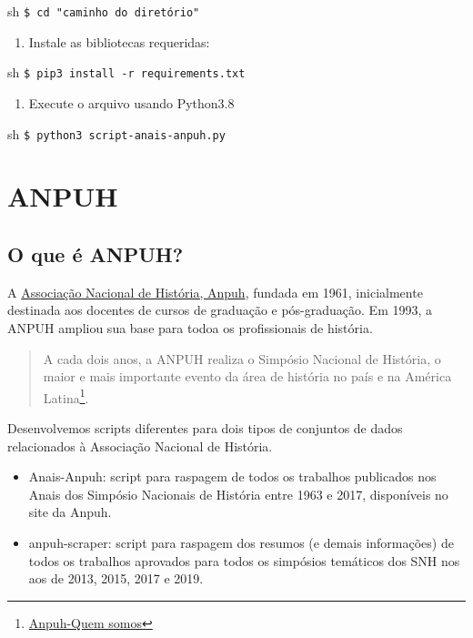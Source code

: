 \documentclass[
]{book}
\providecommand{\tightlist}{%
  \setlength{\itemsep}{0pt}\setlength{\parskip}{0pt}}
\begin{document}
sh
\texttt{\$\ cd\ "caminho\ do\ diretório"}

\begin{enumerate}
\def\labelenumi{\arabic{enumi}.}
\tightlist
\item
  Instale as bibliotecas requeridas:
\end{enumerate}

sh
\texttt{\$\ pip3\ install\ -r\ requirements.txt}

\begin{enumerate}
\def\labelenumi{\arabic{enumi}.}
\tightlist
\item
  Execute o arquivo usando Python3.8
\end{enumerate}

sh
\texttt{\$\ python3\ script-anais-anpuh.py}

\hypertarget{anpuh}{%
\chapter{ANPUH}\label{anpuh}}

\hypertarget{o-que-uxe9-anpuh}{%
\section{O que é ANPUH?}\label{o-que-uxe9-anpuh}}

A \href{https://anpuh.org.br/index.php}{Associação Nacional de História, Anpuh}, fundada em 1961, inicialmente destinada aos docentes de cursos de graduação e pós-graduação. Em 1993, a ANPUH ampliou sua base para todoa os profissionais de história.

\begin{quote}
A cada dois anos, a ANPUH realiza o Simpósio Nacional de História, o maior e mais importante evento da área de história no país e na América Latina\footnote{\href{https://anpuh.org.br/index.php/quem-somos}{Anpuh-Quem somos}}.
\end{quote}

Desenvolvemos scripts diferentes para dois tipos de conjuntos de dados relacionados à Associação Nacional de História.

\begin{itemize}
\item
  Anais-Anpuh: script para raspagem de todos os trabalhos publicados nos Anais dos Simpósio Nacionais de História entre 1963 e 2017, disponíveis no site da Anpuh.
\item
  anpuh-scraper: script para raspagem dos resumos (e demais informações) de todos os trabalhos aprovados para todos os simpósios temáticos dos SNH nos aos de 2013, 2015, 2017 e 2019.
\end{itemize}
\end{document}
